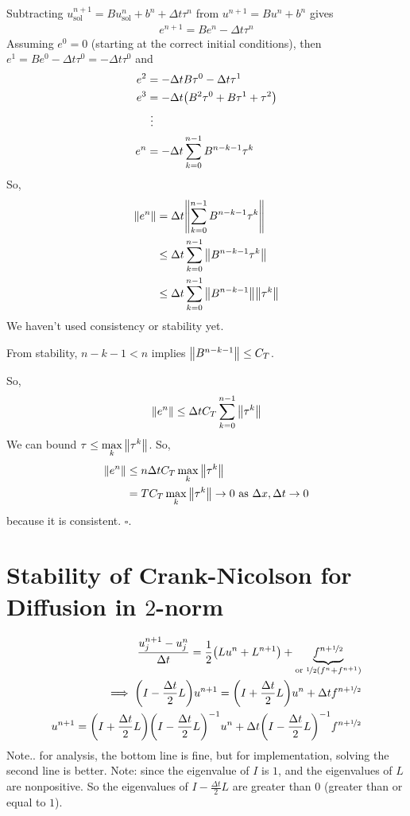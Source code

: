 \documentclass{article}
\newcommand{\half}{\nicefrac{1}{2}}
\newcommand{\Dx}{\Delta x}
\newcommand{\Dt}{\Delta t}
\newcommand{\centdiff}{\frac{u_j^{n+1} - u_j^n}{\Dt}}
\begin{document}
        Subtracting $u_\text{sol}^{n+1} = Bu_\text{sol}^n + b^n + \Dt \tau^n$ from $u^{n+1} = Bu^n + b^n$ gives
        \begin{align*}
            e^{n+1} = Be^n - \Dt\tau^n
        \end{align*}
        Assuming $e^0 = 0$ (starting at the correct initial conditions), then $e^1 = Be^0 - \Dt \tau^0 = -\Dt \tau^0$ and
        \begin{align*}
            e^2 &= -\Dt B\tau^0 - \Dt \tau^1 \\
            e^3 &= -\Dt\qty(B^2\tau^0 + B\tau^1 + \tau^2) \\
            &\ \vdots \\
            e^n &= -\Dt\sum_{k=0}^{n-1}B^{n-k-1}\tau^k
        \end{align*}
        So,
        \begin{align*}
            \norm{e^n} &= \Dt\norm{\sum_{k=0}^{n-1}B^{n-k-1}\tau^k} \\
            &\leq \Dt \sum_{k=0}^{n-1}\norm{B^{n-k-1}\tau^k} \\
            &\leq \Dt \sum_{k=0}^{n-1}\norm{B^{n-k-1}}\norm{\tau^k}
        \end{align*}
        We haven't used consistency or stability yet.
        \begin{adjustwidth}{1in}{0in}
            From stability, $n - k - 1 < n$ implies $\norm{B^{n-k-1}} \leq C_T$.
        \end{adjustwidth}
        So,
        \begin{align*}
            \norm{e^n} \leq \Dt C_T \sum_{k=0}^{n-1}\norm{\tau^k}
        \end{align*}
        We can bound $\displaystyle\tau \leq \max_{k}\norm{\tau^k}$.  So,
        \begin{align*}
            \norm{e^n} &\leq n\Dt C_T \max_{k}\norm{\tau^k} \\
            &= TC_T \max_{k}\norm{\tau^k} \rightarrow 0 \text{ as } \Dx,\Dt \rightarrow 0
        \end{align*}
        because it is consistent. \hfill $\square$.

    \section{Stability of Crank-Nicolson for Diffusion in $2$-norm}
        \begin{align*}
            \centdiff = \frac{1}{2}\qty(Lu^n + L^{n+1}) + \underbrace{f^{n+\half}}_{\text{or } \half\qty(f^n+f^{n+1})} \\
            \implies \qty(I - \frac{\Dt}{2}L)u^{n+1} = \qty(I + \frac{\Dt}{2}L)u^n + \Dt f^{n+\half} \\
            u^{n+1} = \qty(I + \frac{\Dt}{2}L)\qty(I - \frac{\Dt}{2}L)^{-1}u^n + \Dt\qty(I - \frac{\Dt}{2}L)^{-1}f^{n+\half}
        \end{align*}
        Note.. for analysis, the bottom line is fine, but for implementation, solving the second line is better.  Note: since the eigenvalue of $I$ is $1$, and the eigenvalues of $L$ are nonpositive.  So the eigenvalues of $I - \frac{\Dt}{2}L$ are greater than $0$ (greater than or equal to $1$).
\end{document}
